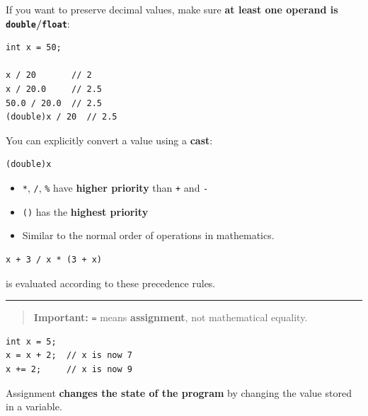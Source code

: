 \documentclass[11pt,a4paper]{article}
\providecommand{\tightlist}{\setlength{\itemsep}{0pt}\setlength{\parskip}{0pt}}
\begin{document}
\label{037-division-with-double}
\hypertarget{037-division-with-double}{}

If you want to preserve decimal values, make sure \textbf{at least one operand is \texttt{double}/\texttt{float}}:

\begin{lstlisting}[style=cscode]
int x = 50;

x / 20       // 2
x / 20.0     // 2.5
50.0 / 20.0  // 2.5
(double)x / 20  // 2.5
\end{lstlisting}

You can explicitly convert a value using a \textbf{cast}:

\begin{lstlisting}[style=cscode]
(double)x
\end{lstlisting}

\label{038-operator-precedence}
\hypertarget{038-operator-precedence}{}

\begin{itemize}
\tightlist
\item
  \texttt{*}, \texttt{/}, \texttt{\%} have \textbf{higher priority} than \texttt{+} and \texttt{-}
\item
  \texttt{()} has the \textbf{highest priority}
\item
  Similar to the normal order of operations in mathematics.
\end{itemize}

\begin{lstlisting}[style=cscode]
x + 3 / x * (3 + x)
\end{lstlisting}

is evaluated according to these precedence rules.

\begin{center}\rule{0.5\linewidth}{0.5pt}\end{center}

\begin{quote}
\textbf{Important:} \texttt{=} means \textbf{assignment}, not mathematical equality.
\end{quote}

\begin{lstlisting}[style=cscode]
int x = 5;
x = x + 2;  // x is now 7
x += 2;     // x is now 9
\end{lstlisting}

Assignment \textbf{changes the state of the program} by changing the value stored in a variable.
\end{document}
